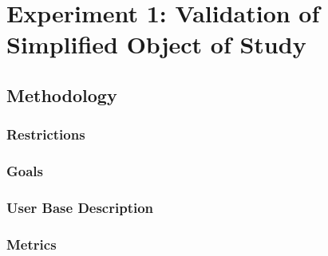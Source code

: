 

\section{Experiment 1: Validation of Simplified Object of Study}

\subsection{Methodology}

\subsubsection{Restrictions}


\subsubsection{Goals}


\subsubsection{User Base Description}


\subsubsection{Metrics}


